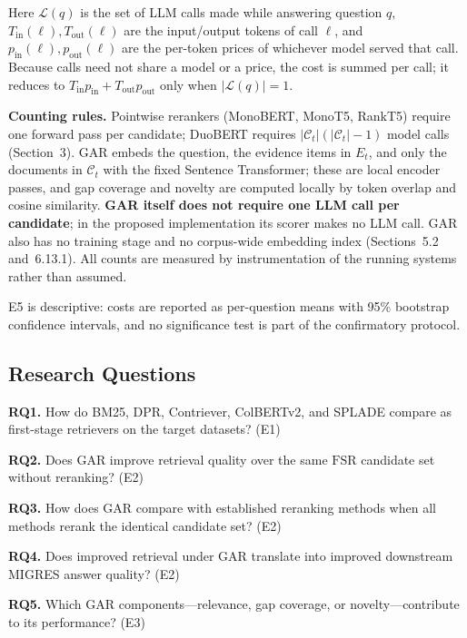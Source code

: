 \documentclass[11pt,a4paper]{article}
\begin{document}
Here $\mathcal{L}(q)$ is the set of LLM calls made while answering question $q$, $T_{\mathrm{in}}(\ell),T_{\mathrm{out}}(\ell)$ are the input/output tokens of call $\ell$, and $p_{\mathrm{in}}(\ell),p_{\mathrm{out}}(\ell)$ are the per-token prices of whichever model served that call. Because calls need not share a model or a price, the cost is summed per call; it reduces to $T_{\mathrm{in}}p_{\mathrm{in}}+T_{\mathrm{out}}p_{\mathrm{out}}$ only when $|\mathcal{L}(q)|=1$.

\textbf{Counting rules.} Pointwise rerankers (MonoBERT, MonoT5, RankT5) require one forward pass per candidate; DuoBERT requires $|\mathcal{C}_t|(|\mathcal{C}_t|-1)$ model calls (Section~3). GAR embeds the question, the evidence items in $E_t$, and only the documents in $\mathcal{C}_t$ with the fixed Sentence Transformer; these are local encoder passes, and gap coverage and novelty are computed locally by token overlap and cosine similarity. \textbf{GAR itself does not require one LLM call per candidate}; in the proposed implementation its scorer makes no LLM call. GAR also has no training stage and no corpus-wide embedding index (Sections~5.2 and~6.13.1). All counts are measured by instrumentation of the running systems rather than assumed.

E5 is descriptive: costs are reported as per-question means with 95\% bootstrap confidence intervals, and no significance test is part of the confirmatory protocol.

\subsection{Research Questions}
\label{sec:rq}

\textbf{RQ1.} How do BM25, DPR, Contriever, ColBERTv2, and SPLADE compare as first-stage retrievers on the target datasets? \hfill (E1)

\textbf{RQ2.} Does GAR improve retrieval quality over the same $\mathrm{FSR}$ candidate set without reranking? \hfill (E2)

\textbf{RQ3.} How does GAR compare with established reranking methods when all methods rerank the identical candidate set? \hfill (E2)

\textbf{RQ4.} Does improved retrieval under GAR translate into improved downstream MIGRES answer quality? \hfill (E2)

\textbf{RQ5.} Which GAR components---relevance, gap coverage, or novelty---contribute to its performance? \hfill (E3)
\end{document}
